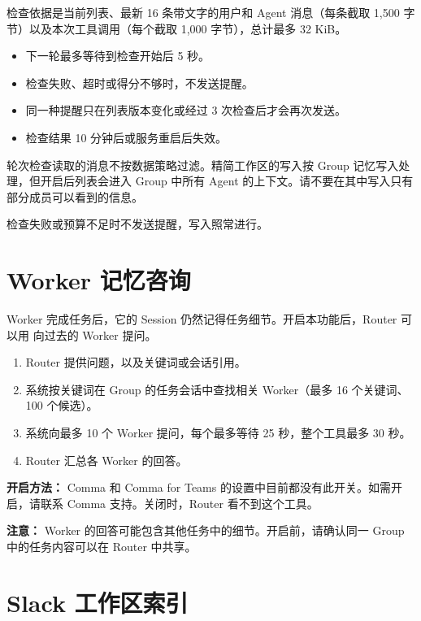 \documentclass[UTF8,a4paper,11pt]{ctexart}
\begin{document}
检查依据是当前列表、最新 16 条带文字的用户和 Agent 消息（每条截取 1,500 字节）以及本次工具调用（每个截取 1,000 字节），总计最多 32 KiB。

\begin{itemize}
  \item 下一轮最多等待到检查开始后 5 秒。
  \item 检查失败、超时或得分不够时，不发送提醒。
  \item 同一种提醒只在列表版本变化或经过 3 次检查后才会再次发送。
  \item 检查结果 10 分钟后或服务重启后失效。
\end{itemize}

\begin{warn}[信息流]
轮次检查读取的消息不按数据策略过滤。精简工作区的写入按 Group 记忆写入处理，但开启后列表会进入 Group 中所有 Agent 的上下文。请不要在其中写入只有部分成员可以看到的信息。
\end{warn}

检查失败或预算不足时不发送提醒，写入照常进行。

\section{Worker 记忆咨询}

Worker 完成任务后，它的 Session 仍然记得任务细节。开启本功能后，Router 可以用  向过去的 Worker 提问。

\begin{enumerate}
  \item Router 提供问题，以及关键词或会话引用。
  \item 系统按关键词在 Group 的任务会话中查找相关 Worker（最多 16 个关键词、100 个候选）。
  \item 系统向最多 10 个 Worker 提问，每个最多等待 25 秒，整个工具最多 30 秒。
  \item Router 汇总各 Worker 的回答。
\end{enumerate}

\textbf{开启方法：} Comma 和 Comma for Teams 的设置中目前都没有此开关。如需开启，请联系 Comma 支持。关闭时，Router 看不到这个工具。

\textbf{注意：} Worker 的回答可能包含其他任务中的细节。开启前，请确认同一 Group 中的任务内容可以在 Router 中共享。

\section{Slack 工作区索引}\label{sec:slack}
\end{document}
